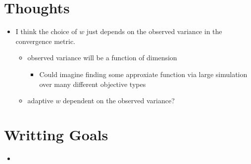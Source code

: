 \documentclass{article}
\begin{document}
%
%
%

%
\section{Thoughts}
%
\begin{itemize}
\item I think the choice of $w$ just depends on the observed variance in the convergence metric.
	\begin{itemize}
		\item observed variance will be a function of dimension
		\begin{itemize}
			\item Could imagine finding some approxiate function via large simulation over many different objective types
		\end{itemize}
		\item adaptive $w$ dependent on the observed variance?
	\end{itemize}
\end{itemize}

%
%
%

%
\section{Writting Goals}
%
\begin{itemize}
\item
\end{itemize}







\clearpage
\end{document}
